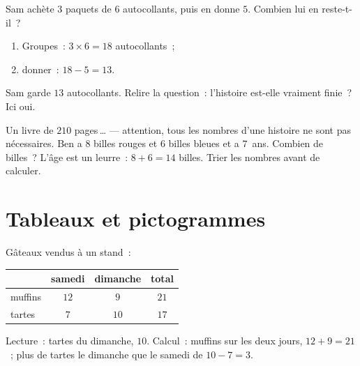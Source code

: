 \begin{example}\label{ex:g2:problems:twostep}
\guillemotleft{} Sam achète $3$ paquets de $6$ autocollants, puis
en donne $5$. Combien lui en reste-t-il~? \guillemotright{}
\begin{enumerate}
  \item Groupes~: $3 \times 6 = 18$ autocollants~;
  \item donner~: $18 - 5 = 13$.
\end{enumerate}
Sam garde $13$ autocollants. Relire la question~: l'histoire est-elle
vraiment finie~? Ici oui.
\end{example}

\begin{example}\label{ex:g2:problems:extra}
\guillemotleft{} Un livre de $210$ pages\,\dots \guillemotright{} ---
attention, tous les nombres d'une histoire ne sont pas nécessaires.
\guillemotleft{} Ben a $8$ billes rouges et $6$ billes bleues et a
$7$~ans. Combien de billes~? \guillemotright{} L'âge est un
leurre~: $8 + 6 = 14$ billes. Trier les nombres avant de calculer.
\end{example}

\section{Tableaux et pictogrammes}

\begin{example}[Un tableau]\label{ex:g2:problems:table}
Gâteaux vendus à un stand~:
\begin{center}
\renewcommand{\arraystretch}{1.3}
\begin{tabular}{l|ccc}
 & samedi & dimanche & total \\
\hline
muffins & $12$ & $9$ & $21$ \\
tartes & $7$ & $10$ & $17$ \\
\end{tabular}
\end{center}
Lecture~: tartes du dimanche, $10$. Calcul~: muffins sur les deux
jours, $12 + 9 = 21$~; plus de tartes le dimanche que le samedi de
$10 - 7 = 3$.
\end{example}

